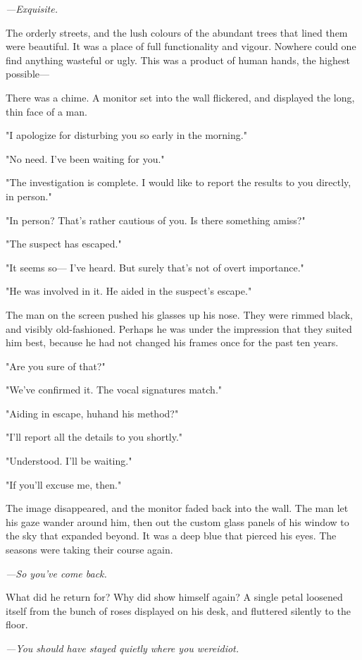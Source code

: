 \emph{---Exquisite.}

The orderly streets, and the lush colours of the abundant trees that
lined them were beautiful. It was a place of full functionality and
vigour. Nowhere could one find anything wasteful or ugly. This was a
product of human hands, the highest possible---

There was a chime. A monitor set into the wall flickered, and displayed
the long, thin face of a man.

"I apologize for disturbing you so early in the morning."

"No need. I've been waiting for you."

"The investigation is complete. I would like to report the results to
you directly, in person."

"In person? That's rather cautious of you. Is there something amiss?"

"The suspect has escaped."

"It seems so--- I've heard. But surely that's not of overt importance."

"He was involved in it. He aided in the suspect's escape."

The man on the screen pushed his glasses up his nose. They were rimmed
black, and visibly old-fashioned. Perhaps he was under the impression
that they suited him best, because he had not changed his frames once
for the past ten years.

"Are you sure of that?"

"We've confirmed it. The vocal signatures match."

"Aiding in escape, huh\el and his method?"

"I'll report all the details to you shortly."

"Understood. I'll be waiting."

"If you'll excuse me, then."

The image disappeared, and the monitor faded back into the wall. The man
let his gaze wander around him, then out the custom glass panels of his
window to the sky that expanded beyond. It was a deep blue that pierced
his eyes. The seasons were taking their course again.

\emph{---So you've come back.}

What did he return for? Why did show himself again? A single petal
loosened itself from the bunch of roses displayed on his desk, and
fluttered silently to the floor.

\emph{---You should have stayed quietly where you were\el idiot.}

